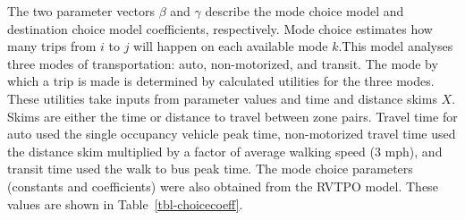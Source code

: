 \documentclass[
  letterpaper,
  number,
  review,
  3p]{elsarticle}
\begin{document}
The two parameter vectors \(\beta\) and \(\gamma\) describe the mode
choice model and destination choice model coefficients, respectively.
Mode choice estimates how many trips from \(i\) to \(j\) will happen on
each available mode \(k\).This model analyses three modes of
transportation: auto, non-motorized, and transit. The mode by which a
trip is made is determined by calculated utilities for the three modes.
These utilities take inputs from parameter values and time and distance
skims \(X\). Skims are either the time or distance to travel between
zone pairs. Travel time for auto used the single occupancy vehicle peak
time, non-motorized travel time used the distance skim multiplied by a
factor of average walking speed (3 mph), and transit time used the walk
to bus peak time. The mode choice parameters (constants and
coefficients) were also obtained from the RVTPO model. These values are
shown in Table~\ref{tbl-choicecoeff}.
\end{document}
